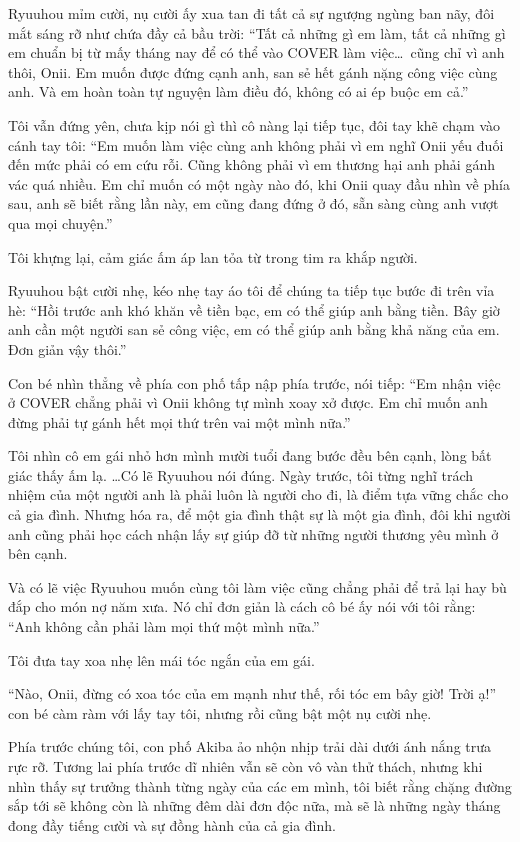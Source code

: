 \documentclass[../main.tex]{subfiles}
\begin{document}
Ryuuhou mỉm cười, nụ cười ấy xua tan đi tất cả sự ngượng ngùng ban nãy, đôi mắt sáng rỡ như chứa đầy cả bầu trời: ``Tất cả những gì em làm, tất cả những gì em chuẩn bị từ mấy tháng nay để có thể vào COVER làm việc\dots\ cũng chỉ vì anh thôi, Onii. Em muốn được đứng cạnh anh, san sẻ hết gánh nặng công việc cùng anh. Và em hoàn toàn tự nguyện làm điều đó, không có ai ép buộc em cả.''

Tôi vẫn đứng yên, chưa kịp nói gì thì cô nàng lại tiếp tục, đôi tay khẽ chạm vào cánh tay tôi: ``Em muốn làm việc cùng anh không phải vì em nghĩ Onii yếu đuối đến mức phải có em cứu rỗi. Cũng không phải vì em thương hại anh phải gánh vác quá nhiều. Em chỉ muốn có một ngày nào đó, khi Onii quay đầu nhìn về phía sau, anh sẽ biết rằng lần này, em cũng đang đứng ở đó, sẵn sàng cùng anh vượt qua mọi chuyện.''

Tôi khựng lại, cảm giác ấm áp lan tỏa từ trong tim ra khắp người.

Ryuuhou bật cười nhẹ, kéo nhẹ tay áo tôi để chúng ta tiếp tục bước đi trên vỉa hè: ``Hồi trước anh khó khăn về tiền bạc, em có thể giúp anh bằng tiền. Bây giờ anh cần một người san sẻ công việc, em có thể giúp anh bằng khả năng của em. Đơn giản vậy thôi.''

Con bé nhìn thẳng về phía con phố tấp nập phía trước, nói tiếp: ``Em nhận việc ở COVER chẳng phải vì Onii không tự mình xoay xở được. Em chỉ muốn anh đừng phải tự gánh hết mọi thứ trên vai một mình nữa.''

Tôi nhìn cô em gái nhỏ hơn mình mười tuổi đang bước đều bên cạnh, lòng bất giác thấy ấm lạ. \dots Có lẽ Ryuuhou nói đúng. Ngày trước, tôi từng nghĩ trách nhiệm của một người anh là phải luôn là người cho đi, là điểm tựa vững chắc cho cả gia đình. Nhưng hóa ra, để một gia đình thật sự là một gia đình, đôi khi người anh cũng phải học cách nhận lấy sự giúp đỡ từ những người thương yêu mình ở bên cạnh.

Và có lẽ việc Ryuuhou muốn cùng tôi làm việc cũng chẳng phải để trả lại hay bù đắp cho món nợ năm xưa. Nó chỉ đơn giản là cách cô bé ấy nói với tôi rằng: ``Anh không cần phải làm mọi thứ một mình nữa.''

Tôi đưa tay xoa nhẹ lên mái tóc ngắn của em gái.

``Nào, Onii, đừng có xoa tóc của em mạnh như thế, rối tóc em bây giờ! Trời ạ!'' con bé càm ràm với lấy tay tôi, nhưng rồi cũng bật một nụ cười nhẹ.

Phía trước chúng tôi, con phố Akiba ảo nhộn nhịp trải dài dưới ánh nắng trưa rực rỡ. Tương lai phía trước dĩ nhiên vẫn sẽ còn vô vàn thử thách, nhưng khi nhìn thấy sự trưởng thành từng ngày của các em mình, tôi biết rằng chặng đường sắp tới sẽ không còn là những đêm dài đơn độc nữa, mà sẽ là những ngày tháng đong đầy tiếng cười và sự đồng hành của cả gia đình.
\end{document}
